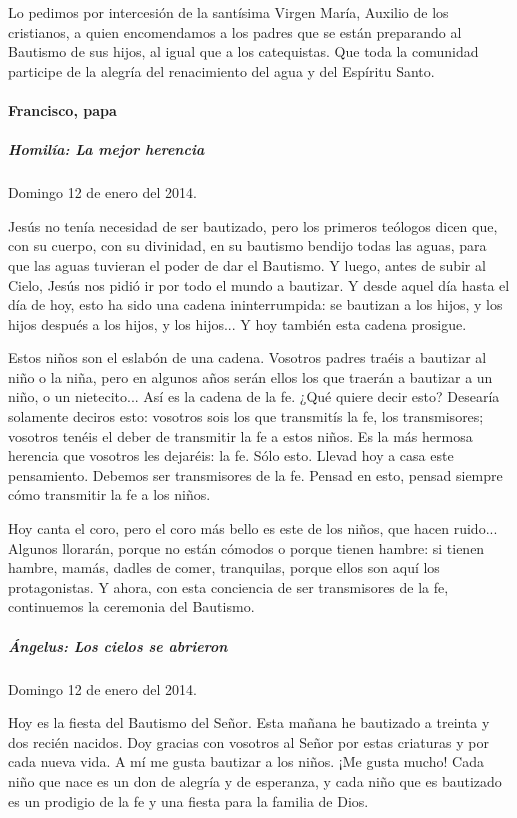 \documentclass[]{article}
\let\oldparagraph\paragraph
\renewcommand{\paragraph}[1]{\oldparagraph{#1}\mbox{}}
\let\oldsubparagraph\subparagraph
\renewcommand{\subparagraph}[1]{\oldsubparagraph{#1}\mbox{}}
\begin{document}
Lo pedimos por intercesión de la santísima Virgen María, Auxilio de los
cristianos, a quien encomendamos a los padres que se están preparando al
Bautismo de sus hijos, al igual que a los catequistas. Que toda la
comunidad participe de la alegría del renacimiento del agua y del
Espíritu Santo.

\paragraph{Francisco, papa}\label{francisco-papa-9}

\subparagraph{Homilía: La mejor
herencia}\label{homiluxeda-la-mejor-herencia}

Domingo 12 de enero del 2014.

Jesús no tenía necesidad de ser bautizado, pero los primeros teólogos
dicen que, con su cuerpo, con su divinidad, en su bautismo bendijo todas
las aguas, para que las aguas tuvieran el poder de dar el Bautismo. Y
luego, antes de subir al Cielo, Jesús nos pidió ir por todo el mundo a
bautizar. Y desde aquel día hasta el día de hoy, esto ha sido una cadena
ininterrumpida: se bautizan a los hijos, y los hijos después a los
hijos, y los hijos... Y hoy también esta cadena prosigue.

Estos niños son el eslabón de una cadena. Vosotros padres traéis a
bautizar al niño o la niña, pero en algunos años serán ellos los que
traerán a bautizar a un niño, o un nietecito... Así es la cadena de la
fe. ¿Qué quiere decir esto? Desearía solamente deciros esto: vosotros
sois los que transmitís la fe, los transmisores; vosotros tenéis el
deber de transmitir la fe a estos niños. Es la más hermosa herencia que
vosotros les dejaréis: la fe. Sólo esto. Llevad hoy a casa este
pensamiento. Debemos ser transmisores de la fe. Pensad en esto, pensad
siempre cómo transmitir la fe a los niños.

Hoy canta el coro, pero el coro más bello es este de los niños, que
hacen ruido... Algunos llorarán, porque no están cómodos o porque tienen
hambre: si tienen hambre, mamás, dadles de comer, tranquilas, porque
ellos son aquí los protagonistas. Y ahora, con esta conciencia de ser
transmisores de la fe, continuemos la ceremonia del Bautismo.

\subparagraph{Ángelus: Los cielos se
abrieron}\label{uxe1ngelus-los-cielos-se-abrieron}

Domingo 12 de enero del 2014.

Hoy es la fiesta del Bautismo del Señor. Esta mañana he bautizado a
treinta y dos recién nacidos. Doy gracias con vosotros al Señor por
estas criaturas y por cada nueva vida. A mí me gusta bautizar a los
niños. ¡Me gusta mucho! Cada niño que nace es un don de alegría y de
esperanza, y cada niño que es bautizado es un prodigio de la fe y una
fiesta para la familia de Dios.
\end{document}
